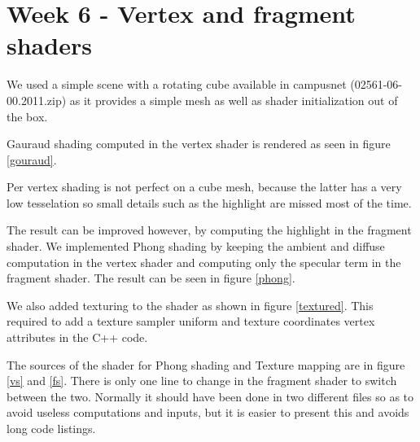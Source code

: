 \chapter{Week 6 - Vertex and fragment shaders}

We used a simple scene with a rotating cube available in campusnet (02561-06-00.2011.zip)
as it provides a simple mesh as well as shader initialization out of the box.

Gauraud shading computed in the vertex shader is rendered as seen in figure \ref{gouraud}.

Per vertex shading is not perfect on a cube mesh, because the latter has a very low
tesselation so small details such as the highlight are missed most of the time.

The result can be improved however, by computing the highlight in the fragment shader.
We implemented Phong shading by keeping the ambient and diffuse computation in the
vertex shader and computing only the specular term in the fragment shader. The result
can be seen in figure \ref{phong}.

We also added texturing to the shader as shown in figure \ref{textured}. This required
to add a texture sampler uniform and texture coordinates vertex attributes in the C++
code.   


The sources of the shader for Phong shading and Texture mapping are in figure \ref{vs} and \ref{fs}.
There is only one line to change in the fragment shader to switch between the two.
Normally it should have been done in two different files so as to avoid useless
computations and inputs, but it is easier to present this and avoids long code listings.


